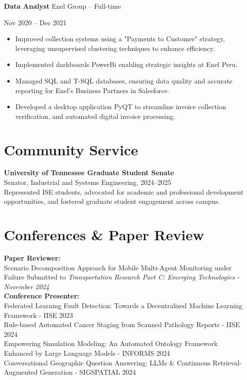 \documentclass[10pt, letterpaper]{article}
\newenvironment{highlights}{
    \begin{itemize}[
        topsep=0.10 cm,
        parsep=0.10 cm,
        partopsep=0pt,
        itemsep=0pt,
        leftmargin=0 cm + 10pt
    ]
}{
    \end{itemize}
} %
\newenvironment{twocolentry}[2][]{
    \onecolentry
    \def\secondColumn{#2}
    \setcolumnwidth{\fill, 4.5 cm}
    \begin{paracol}{2}
}{
    \switchcolumn \raggedleft \secondColumn
    \end{paracol}
    \endonecolentry
} %
\begin{document}
\begin{twocolentry}{Nov 2020 – Dec 2021}
    \textbf{Data Analyst} \textbar Enel Group – Full-time
\end{twocolentry}
\begin{highlights}
    \item Improved collection systems using a "Payments to Customer" strategy, leveraging unsupervised clustering techniques to enhance efficiency.
    \item Implemented dashboards PowerBi enabling strategic insights at Enel Peru.
    \item Managed SQL and T-SQL databases, ensuring data quality and accurate reporting for Enel's Business Partners in Salesforce.
    \item Developed a desktop application PyQT to streamline invoice collection verification, and automated digital invoice processing.
\end{highlights}

\vspace{0.3cm}






\section*{Community Service}

\textbf{University of Tennessee Graduate Student Senate} \\  
Senator, Industrial and Systems Engineering, 2024–2025 \\  
Represented ISE students, advocated for academic and professional development opportunities, and fostered graduate student engagement across campus.



\section*{Conferences \& Paper Review}
\textbf{Paper Reviewer:}\\
Scenario Decomposition Approach for Mobile Multi-Agent Monitoring under Failure
Submitted to \textit{Transportation Research Part C: Emerging Technologies - November 2024} \\


\textbf{Conference Presenter:}\\
Federated Learning Fault Detection: Towards a Decentralized Machine Learning Framework - IISE 2023\\
Rule-based Automated Cancer Staging from Scanned Pathology Reports - IISE 2024\\
Empowering Simulation Modeling: An Automated Ontology Framework Enhanced by Large Language Models - INFORMS 2024\\
Conversational Geographic Question Answering: LLMs \& Continuous Retrieval-Augmented Generation - SIGSPATIAL 2024\\
\end{document}

